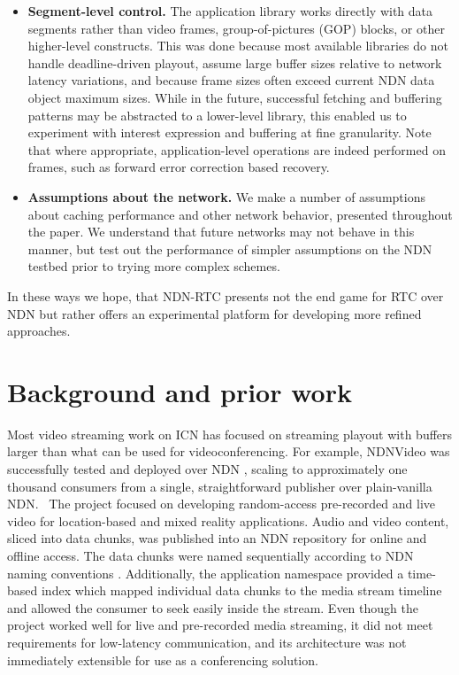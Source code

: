 \documentclass{icn/sig-alternate-2013} %
\newcommand{\ndnrtcName}{NDN-RTC} %
\begin{document}
\begin{itemize} 

\item \textbf{Segment-level control.}  The application library works directly with data segments rather than video frames, group-of-pictures (GOP) blocks, or other higher-level constructs.  This was done because most available libraries do not handle deadline-driven playout, assume large buffer sizes relative to network latency variations, and because frame sizes often exceed current NDN data object maximum sizes.  While in the future, successful fetching and buffering patterns may be abstracted to a lower-level library, this enabled us to experiment with interest expression and buffering at fine granularity.  Note that where appropriate, application-level operations are indeed performed on frames, such as forward error correction based recovery. 

\item \textbf{Assumptions about the network.}  We make a number of  assumptions about caching performance and other network behavior, presented throughout the paper. We understand that future networks may not behave in this manner, but test out the performance of simpler assumptions on the NDN testbed prior to trying more complex schemes.  

\end{itemize}

In these ways we hope, that \ndnrtcName{} presents not the end game for RTC over NDN but rather offers an experimental platform for developing more refined approaches. 

\section{Background and prior work}
\label{sec:bg}


Most video streaming work on ICN has focused on streaming playout with buffers larger than what can be used for videoconferencing.  For example, NDNVideo was successfully tested and deployed over NDN \cite{ndnvideo}, scaling to approximately one thousand consumers from a single, straightforward publisher over plain-vanilla NDN.~\cite{CrowleyNEAPresentation} The project focused on developing random-access pre-recorded and live video for location-based and mixed reality applications. Audio and video content, sliced into data chunks, was published into an NDN repository for online and offline access. The data chunks were named sequentially according to NDN naming conventions \cite{ndnnaming}. Additionally, the application namespace provided a time-based index which mapped individual data chunks to the media stream timeline and allowed the consumer to seek easily inside the stream. Even though the project worked well for live and pre-recorded media streaming, it did not meet requirements for low-latency communication, and its architecture was not immediately extensible for use as a conferencing solution.
\end{document}
